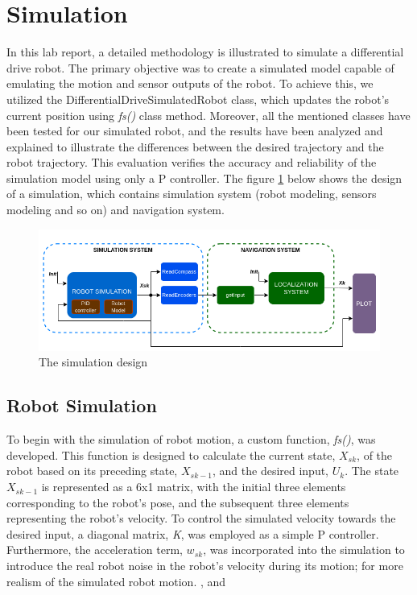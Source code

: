 \documentclass[letterpaper,12pt]{article}
\begin{document}
\section{Simulation}
\label{sec:Simulation}
In this lab report, a detailed methodology is illustrated to simulate a differential drive robot. The primary objective was to create a simulated model capable of emulating the motion and sensor outputs of the robot. To achieve this, we utilized the DifferentialDriveSimulatedRobot class, which updates the robot’s current position using \textit{fs()} class method. Moreover, all the mentioned classes have been tested for our simulated robot, and the results have been analyzed and explained to illustrate the differences between the desired trajectory and the robot trajectory. This evaluation verifies the accuracy and reliability of the simulation model using only a P controller. The figure \ref{fig:00} below shows the design of a simulation, which contains simulation system (robot modeling, sensors modeling and so on) and navigation system.
\begin{figure}[H]
\centering
\includegraphics[width=16cm]{Figures/system_design.png}
\caption{The simulation design}
\label{fig:00}
\end{figure}

\subsection{ Robot Simulation}
\label{sec:robotSimulation}
To begin with the simulation of robot motion, a custom function, \textit{fs()}, was developed. This function is designed to calculate the current state, ${X_{sk}}$, of the robot based on its preceding state, ${X_{sk-1}}$, and the desired input, ${U_{k}}$. The state ${X_{sk-1}}$ is represented as a 6x1 matrix, with the initial three elements corresponding to the robot's pose, and the subsequent three elements representing the robot's velocity.
To control the simulated velocity towards the desired input, a diagonal matrix, \textit{K}, was employed as a simple P controller. Furthermore, the acceleration term, ${w_{sk}}$, was incorporated into the simulation to introduce the real robot noise in the robot's velocity during its motion; for more realism of the simulated robot motion. \cite{Lectures}, \cite{Book} and \cite{SoftwareDesign} 
\end{document}
